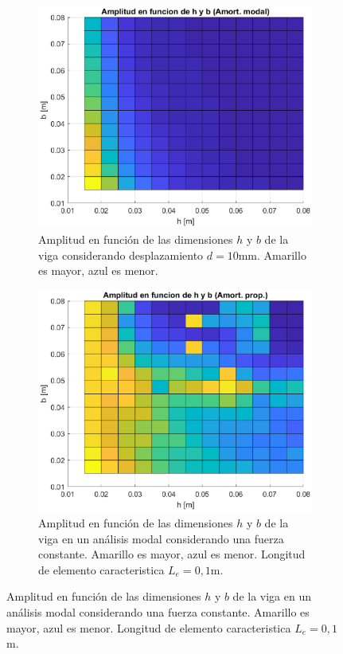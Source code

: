 \documentclass[onecolumn,10pt,titlepage,a4paper]{article}
\begin{document}
\begin{figure}[htb!]
	\centering
	\begin{subfigure}{0.47\textwidth}
		\includegraphics[width=\linewidth]{fig/amplitudVshb.eps}
		\caption{Amplitud en función de las dimensiones $h$ y $b$ de la viga considerando desplazamiento $d=10$mm. Amarillo es mayor, azul es menor.}
		\label{fig:amplitudVshb}
	\end{subfigure}
\hfill
	\begin{subfigure}{0.5\textwidth}
		\includegraphics[width=\linewidth]{fig/amplitudVshbProp.eps}
		\caption{Amplitud en función de las dimensiones $h$ y $b$ de la viga en un análisis modal considerando una fuerza constante. Amarillo es mayor, azul es menor. Longitud de elemento caracteristica $L_e=0,1$m.}
		\label{fig:amplitudVshbProp}
	\end{subfigure}
\end{figure}
\end{document}
